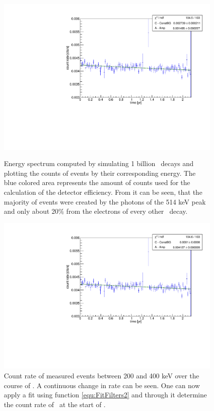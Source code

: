 \documentclass[encoding=utf8,british]{tumphthesis}
\begin{document}
\begin{figure}[t!]
	\centering
	\begin{minipage}[t]{.475\textwidth}
		\centering
		\includegraphics[width=\textwidth]{./Bilder/eventRateFit.pdf}
		\caption{
			Energy spectrum computed by simulating 1 billion \Kr\ decays and plotting the counts of events by their corresponding energy.
			The blue colored area represents the amount of counts used for the calculation of the detector efficiency.
			From it can be seen, that the majority of events were created by the photons of the 514 keV peak and only about 20$\%$ from the electrons of every other \Kr\ decay.
		}
		\label{fig:eventRateFit}
	\end{minipage}\hfill%
	\begin{minipage}[t]{.475\textwidth}
		\centering
		\includegraphics[width=\textwidth]{./Bilder/Argon.pdf}
		\caption{
			Count rate of measured events between 200 and 400 keV over the course of \PII.
			A continuous change in rate can be seen. 
			One can now apply a fit using function \ref{equ:FitFilters2} and through it determine the count rate of \Kr\ at the start of \PII.
		}
		\label{fig:Argon}
	\end{minipage}
\end{figure}
\end{document}
